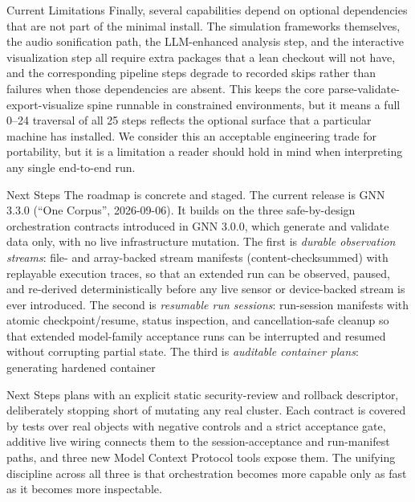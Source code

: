 \documentclass[
  ignorenonframetext,
]{beamer}
\begin{document}
\begin{frame}{Current Limitations}
Finally, several capabilities depend on optional dependencies that are
not part of the minimal install. The simulation frameworks themselves,
the audio sonification path, the LLM-enhanced analysis step, and the
interactive visualization step all require extra packages that a lean
checkout will not have, and the corresponding pipeline steps degrade to
recorded skips rather than failures when those dependencies are absent.
This keeps the core parse-validate-export-visualize spine runnable in
constrained environments, but it means a full 0--24 traversal of all 25
steps reflects the optional surface that a particular machine has
installed. We consider this an acceptable engineering trade for
portability, but it is a limitation a reader should hold in mind when
interpreting any single end-to-end run.
\end{frame}

\begin{frame}[allowframebreaks]{Next Steps}
\protect{}\label{next-steps}
The roadmap is concrete and staged. The current release is GNN 3.3.0
(``One Corpus'', 2026-09-06). It builds on the three safe-by-design
orchestration contracts introduced in GNN 3.0.0, which generate and
validate data only, with no live infrastructure mutation. The first is
\emph{durable observation streams}: file- and array-backed stream
manifests (content-checksummed) with replayable execution traces, so
that an extended run can be observed, paused, and re-derived
deterministically before any live sensor or device-backed stream is ever
introduced. The second is \emph{resumable run sessions}: run-session
manifests with atomic checkpoint/resume, status inspection, and
cancellation-safe cleanup so that extended model-family acceptance runs
can be interrupted and resumed without corrupting partial state. The
third is \emph{auditable container plans}: generating hardened container
\end{frame}

\begin{frame}[allowframebreaks]{Next Steps}
plans with an explicit static security-review and rollback descriptor,
deliberately stopping short of mutating any real cluster. Each contract
is covered by tests over real objects with negative controls and a
strict acceptance gate, additive live wiring connects them to the
session-acceptance and run-manifest paths, and three new Model Context
Protocol tools expose them. The unifying discipline across all three is
that orchestration becomes more capable only as fast as it becomes more
inspectable.

\end{frame}
\end{document}
